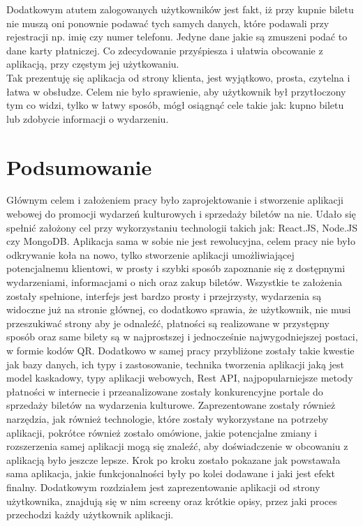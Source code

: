 \documentclass[12pt]{article}
\begin{document}
\begin{sloppypar}
{\begin{figure}[H]
    \label{fig:purchase_his}
  \end{figure}
  Dodatkowym atutem zalogowanych użytkowników jest fakt, iż przy kupnie biletu nie muszą oni ponownie podawać tych samych danych, które podawali przy rejestracji np. imię czy numer telefonu. 
  Jedyne dane jakie są zmuszeni podać to dane karty płatniczej. Co zdecydowanie przyśpiesza i ułatwia obcowanie z aplikacją, przy częstym jej użytkowaniu.\\
  Tak prezentuję się aplikacja od strony klienta, jest wyjątkowo, prosta, czytelna i łatwa w obsłudze. 
  Celem nie było sprawienie, aby użytkownik był przytłoczony tym co widzi, tylko w łatwy sposób, mógł osiągnąć cele takie jak: kupno biletu lub zdobycie informacji o wydarzeniu.
}

\section{Podsumowanie}
{
  Głównym celem i założeniem pracy było zaprojektowanie i stworzenie aplikacji webowej do promocji wydarzeń kulturowych i sprzedaży biletów na nie. 
  Udało się spełnić założony cel przy wykorzystaniu technologii takich jak: React.JS, Node.JS czy MongoDB. 
  Aplikacja sama w sobie nie jest rewolucyjna, celem pracy nie było odkrywanie koła na nowo, 
  tylko stworzenie aplikacji umożliwiającej potencjalnemu klientowi, w prosty i szybki sposób zapoznanie się z dostępnymi wydarzeniami, informacjami o nich oraz zakup biletów. 
  Wszystkie te założenia zostały spełnione, interfejs jest bardzo prosty i przejrzysty, wydarzenia są widoczne już na stronie głównej, 
  co dodatkowo sprawia, że użytkownik, nie musi przeszukiwać strony aby je odnaleźć, 
  płatności są realizowane w przystępny sposób oraz same bilety są w najprostszej i jednocześnie najwygodniejszej postaci, w formie kodów QR. 
  Dodatkowo w samej pracy przybliżone zostały takie kwestie jak bazy danych, ich typy i zastosowanie, technika tworzenia aplikacji jaką jest model kaskadowy, typy aplikacji webowych, Rest API,
  najpopularniejsze metody płatności w internecie i przeanalizowane zostały konkurencyjne portale do sprzedaży biletów na wydarzenia kulturowe. 
  Zaprezentowane zostały również narzędzia, jak również technologie, które zostały wykorzystane na potrzeby aplikacji, pokrótce również zostało omówione, 
  jakie potencjalne zmiany i rozszerzenia samej aplikacji mogą się znaleźć, aby doświadczenie w obcowaniu z aplikacją było jeszcze lepsze. 
  Krok po kroku zostało pokazane jak powstawała sama aplikacja, jakie funkcjonalności były po kolei dodawane i jaki jest efekt finalny. 
  Dodatkowym rozdziałem jest zaprezentowanie aplikacji od strony użytkownika, znajdują się w nim screeny oraz krótkie opisy, przez jaki proces przechodzi każdy użytkownik aplikacji.
}


\end{sloppypar}
\end{document}
